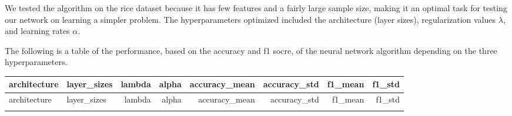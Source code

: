 \documentclass{article}
\begin{document}
We tested the algorithm on the rice dataset because it has few features and a fairly large sample size, making it an optimal task for testing our network on learning a simpler problem. The hyperparameters optimized included the architecture (layer sizes), regularization values $\lambda$, and learning rates $\alpha$. 

The following is a table of the performance, based on the accuracy and f1 socre, of the neural network algorithm depending on the three hyperparameters.  

\begin{longtable}{llrrrrrr}
\toprule
architecture & layer\_sizes & lambda & alpha & accuracy\_mean & accuracy\_std & f1\_mean & f1\_std \\
\midrule
\endfirsthead

\toprule
architecture & layer\_sizes & lambda & alpha & accuracy\_mean & accuracy\_std & f1\_mean & f1\_std \\
\midrule
\endhead

\bottomrule
\endfoot


\end{longtable}
\end{document}
